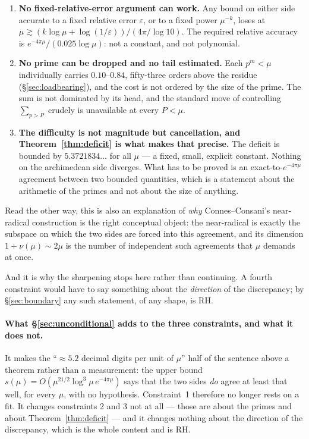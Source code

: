 \documentclass[11pt,a4paper]{article}
\theoremstyle{plain}
\theoremstyle{definition}
\theoremstyle{remark}
\begin{document}
\begin{enumerate}\itemsep4pt
\item \textbf{No fixed-relative-error argument can work.}  Any bound on either
side accurate to a fixed relative error $\varepsilon$, or to a fixed power
$\mu^{-k}$, loses at
$\mu\gtrsim(k\log\mu+\log(1/\varepsilon))/(4\pi/\log10)$.  The required relative
accuracy is $e^{-4\pi\mu}/(0.025\log\mu)$: not a constant, and not polynomial.

\item \textbf{No prime can be dropped and no tail estimated.}  Each $p^m<\mu$
individually carries $0.10$--$0.84$, fifty-three orders above the residue
(\S\ref{sec:loadbearing}), and the cost is not ordered by the size of the prime.
The sum is not dominated by its head, and the standard move of controlling
$\sum_{p>P}$ crudely is unavailable at every $P<\mu$.

\item \textbf{The difficulty is not magnitude but cancellation, and
Theorem~\ref{thm:deficit} is what makes that precise.}  The deficit is bounded by
$5.3721834\ldots$ for all $\mu$ --- a fixed, small, explicit constant.  Nothing
on the archimedean side diverges.  What has to be proved is an
exact-to-$e^{-4\pi\mu}$ agreement between two bounded quantities, which is a
statement about the arithmetic of the primes and not about the size of anything.
\end{enumerate}

Read the other way, this is also an explanation of \emph{why} Connes--Consani's
near-radical construction is the right conceptual object: the near-radical is
exactly the subspace on which the two sides are forced into this agreement, and
its dimension $1+\nu(\mu)\sim2\mu$ is the number of independent such agreements
that $\mu$ demands at once.

And it is why the sharpening stops here rather than continuing.  A fourth
constraint would have to say something about the \emph{direction} of the
discrepancy; by \S\ref{sec:boundary} any such statement, of any shape, is RH.

\paragraph{What \S\ref{sec:unconditional} adds to the three constraints, and
what it does not.}  It makes the ``$\approx5.2$ decimal digits per unit of
$\mu$'' half of the sentence above a theorem rather than a measurement: the
upper bound $s(\mu)=O(\mu^{21/2}\log^3\!\mu\,e^{-4\pi\mu})$ says that the two
sides \emph{do} agree at least that well, for every $\mu$, with no hypothesis.
Constraint~1 therefore no longer rests on a fit.  It changes constraints 2 and 3
not at all --- those are about the primes and about
Theorem~\ref{thm:deficit} --- and it changes nothing about the direction of the
discrepancy, which is the whole content and is RH.
\end{document}
